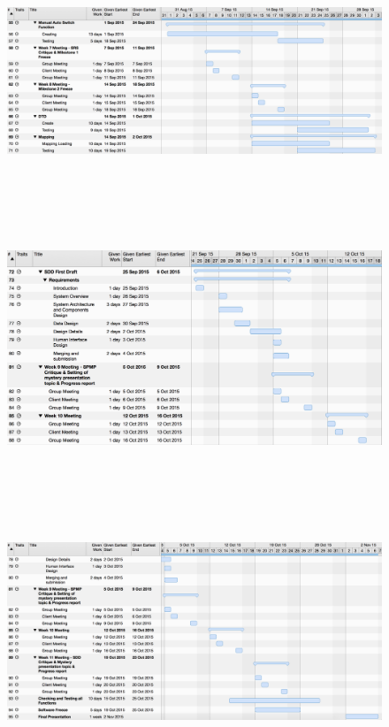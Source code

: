 \documentclass[11pt, a4paper]{article}
\begin{document}
\begin{figure}[H]
\centering
\includegraphics[height=2.6in]{SA4.png}
\end{figure}

\begin{figure}[H]
\centering
\includegraphics[height=3.3in]{SA5.png}
\end{figure}

\begin{figure}[H]
\centering
\includegraphics[height=3in]{SA6.png}
\end{figure}
\end{document}
